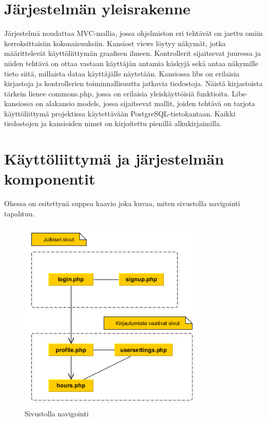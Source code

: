 \documentclass[a4paper, 12pt finnish]{article}
\begin{document}
\section{Järjestelmän yleisrakenne} Järjestelmä noudattaa MVC-mallia,
jossa ohjelmiston eri tehtävät on jaettu omiin kerroksittaisiin
kokonaisuuksiin. Kansiost views löytyy näkymät, jotka määrittelevät
käyttöliittymän graafisen ilmeen. Kontrollerit sijaitsevat juuressa ja
niiden tehtävä on ottaa vastaan käyttäjän antamia käskyjä sekä antaa
näkymille tieto siitä, millaista dataa käyttäjälle näytetään. Kansiossa
libs on erilaisia kirjastoja ja kontrollerien toiminnallisuutta jatkavia
tiedostoja. Näistä kirjastoista tärkein lienee commons.php, jossa on
erilaisia yleiskäyttöisiä funktioita. Libs-kansiossa on alakansio models,
jossa sijaitsevat mallit, joiden tehtävä on tarjota käyttöliittymä 
projektissa käytettävään PostgreSQL-tietokantaan. Kaikki tiedostojen ja
kansioiden nimet on kirjoitettu pienillä alkukirjaimilla.

\section{Käyttöliittymä ja järjestelmän komponentit} Ohessa on esitettynä
suppea kaavio joka kuvaa, miten sivustolla navigointi tapahtuu.
\begin{figure}[htbp]
    \centering
    \includegraphics[width=0.8\textwidth]{kayttoliittymakaavio.png}
    \caption{\small Sivustolla navigointi}
\end{figure}
\end{document}
